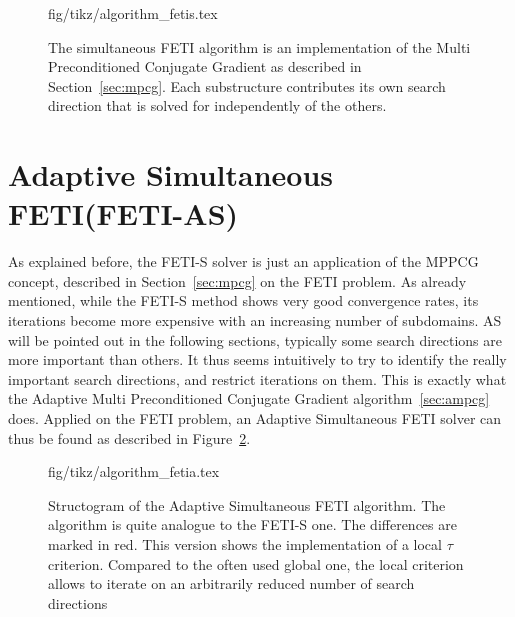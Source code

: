\begin{figure}[h!]
  \centering
  {fig/tikz/algorithm_fetis.tex}
  \caption[Structogram FETI-S algorithm]{The simultaneous FETI algorithm  is an implementation of the Multi Preconditioned Conjugate Gradient as described in Section~\ref{sec:mpcg}. Each substructure contributes its own search direction that is solved for independently of the others.}
  \label{strukt:fetis}
\end{figure}


\section{Adaptive Simultaneous FETI(FETI-AS)}\label{sec:fetias}
As explained before, the FETI-S solver is just an application of the MPPCG concept, described in Section~\ref{sec:mpcg} on the FETI problem. As already mentioned, while the FETI-S method shows very good convergence rates, its iterations become more expensive with an increasing number of subdomains. AS will be pointed out in the following sections, typically some search directions are more important than others. It thus seems intuitively to try to identify the really important search directions, and restrict iterations on them. This is exactly what the Adaptive Multi Preconditioned Conjugate Gradient algorithm~\ref{sec:ampcg} does. Applied on the FETI problem, an Adaptive Simultaneous FETI solver can thus be found as described in Figure~\ref{strukt:fetias}.\\

\begin{figure}[h!]
  \centering
  {fig/tikz/algorithm_fetia.tex}
  \caption[Structogram FETI-AS algorithm]{Structogram of the Adaptive Simultaneous FETI algorithm. The algorithm is quite analogue to the FETI-S one. The differences are marked in red. This version shows the implementation of a local $\tau$ criterion. Compared to the often used global one, the local criterion allows to iterate on an arbitrarily reduced number of search directions}
  \label{strukt:fetias}
\end{figure}

